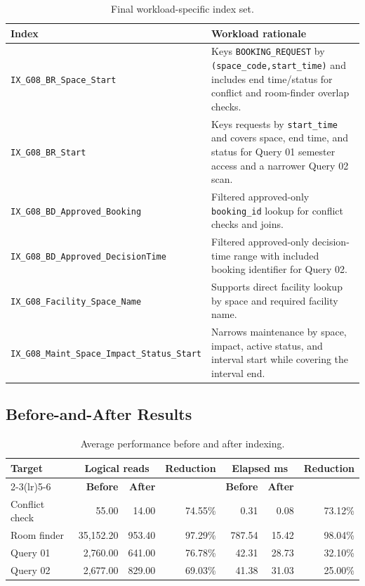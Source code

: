 \begin{table}[H]
  \centering
  \scriptsize
  \begin{tabularx}{\textwidth}{>{\raggedright\arraybackslash}p{4.8cm}X}
    \toprule
    \textbf{Index} & \textbf{Workload rationale}\\
    \midrule
    \nolinkurl{IX_G08_BR_Space_Start} &
    Keys \texttt{BOOKING\_REQUEST} by \texttt{(space\_code,start\_time)} and includes end time/status for conflict and room-finder overlap checks.\\
    \nolinkurl{IX_G08_BR_Start} &
    Keys requests by \texttt{start\_time} and covers space, end time, and status for Query 01 semester access and a narrower Query 02 scan.\\
    \nolinkurl{IX_G08_BD_Approved_Booking} &
    Filtered approved-only \texttt{booking\_id} lookup for conflict checks and joins.\\
    \nolinkurl{IX_G08_BD_Approved_DecisionTime} &
    Filtered approved-only decision-time range with included booking identifier for Query 02.\\
    \nolinkurl{IX_G08_Facility_Space_Name} &
    Supports direct facility lookup by space and required facility name.\\
    \nolinkurl{IX_G08_Maint_Space_Impact_Status_Start} &
    Narrows maintenance by space, impact, active status, and interval start while covering the interval end.\\
    \bottomrule
  \end{tabularx}
  \caption{Final workload-specific index set.}
  \label{tab:index-set}
\end{table}

\subsection{Before-and-After Results}

\begin{table}[H]
  \centering
  \scriptsize
  \begin{tabular}{lrrrrrr}
    \toprule
    \textbf{Target} &
    \multicolumn{2}{c}{\textbf{Logical reads}} &
    \textbf{Reduction} &
    \multicolumn{2}{c}{\textbf{Elapsed ms}} &
    \textbf{Reduction}\\
    \cmidrule(lr){2-3}\cmidrule(lr){5-6}
    & \textbf{Before} & \textbf{After} & & \textbf{Before} & \textbf{After} &\\
    \midrule
    Conflict check & 55.00 & 14.00 & 74.55\% & 0.31 & 0.08 & 73.12\%\\
    Room finder & 35,152.20 & 953.40 & 97.29\% & 787.54 & 15.42 & 98.04\%\\
    Query 01 & 2,760.00 & 641.00 & 76.78\% & 42.31 & 28.73 & 32.10\%\\
    Query 02 & 2,677.00 & 829.00 & 69.03\% & 41.38 & 31.03 & 25.00\%\\
    \bottomrule
  \end{tabular}
  \caption{Average performance before and after indexing.}
  \label{tab:index-performance}
\end{table}

